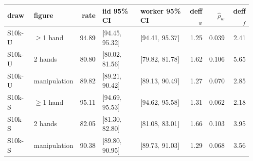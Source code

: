 \begin{tabular}{@{}llrllrrr@{}}
\toprule
draw & figure & rate & iid 95\% CI & worker 95\% CI & deff$_w$ & $\hat{\rho}_w$ & deff$_f$ \\
\midrule
S10k-U & $\geq$1 hand & 94.89 & [94.45, 95.32] & [94.41, 95.37] & 1.25 & 0.039 & 2.41 \\
S10k-U & 2 hands & 80.80 & [80.02, 81.56] & [79.82, 81.78] & 1.62 & 0.106 & 5.65 \\
S10k-U & manipulation & 89.82 & [89.21, 90.42] & [89.13, 90.49] & 1.27 & 0.070 & 2.85 \\
\midrule
S10k-S & $\geq$1 hand & 95.11 & [94.69, 95.53] & [94.62, 95.58] & 1.31 & 0.062 & 2.18 \\
S10k-S & 2 hands & 82.05 & [81.30, 82.80] & [81.08, 83.01] & 1.66 & 0.103 & 3.95 \\
S10k-S & manipulation & 90.38 & [89.80, 90.95] & [89.73, 91.03] & 1.29 & 0.068 & 3.56 \\
\bottomrule
\end{tabular}
